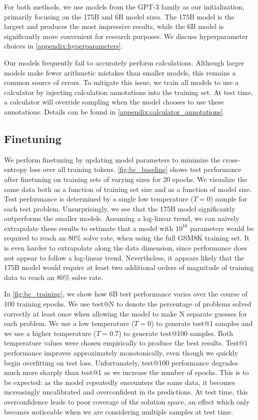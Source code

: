 For both methods, we use models from the GPT-3 family as our initialization, primarily focusing on the 175B and 6B model sizes. The 175B model is the largest and produces the most impressive results, while the 6B model is significantly more convenient for research purposes. We discuss hyperparameter choices in \ref{appendix:hyperparameters}.

Our models frequently fail to accurately perform calculations. Although larger models make fewer arithmetic mistakes than smaller models, this remains a common source of errors. To mitigate this issue, we train all models to use a calculator by injecting calculation annotations into the training set. At test time, a calculator will override sampling when the model chooses to use these annotations. Details can be found in \ref{appendix:calculator_annotations}.

\subsection{Finetuning}

We perform finetuning by updating model parameters to minimize the cross-entropy loss over all training tokens. \ref{fig:bc_baseline} shows test performance after finetuning on training sets of varying sizes for 20 epochs. We visualize the same data both as a function of training set size and as a function of model size. Test performance is determined by a single low temperature ($T=0$) sample for each test problem. Unsurprisingly, we see that the 175B model significantly outperforms the smaller models. Assuming a log-linear trend, we can naively extrapolate these results to estimate that a model with $10^{16}$ parameters would be required to reach an $80\%$ solve rate, when using the full GSM8K training set. It is even harder to extrapolate along the data dimension, since performance does not appear to follow a log-linear trend. Nevertheless, it appears likely that the 175B model would require at least two additional orders of magnitude of training data to reach an $80\%$ solve rate.

In \ref{fig:bc_training}, we show how 6B test performance varies over the course of 100 training epochs. We use test@N to denote the percentage of problems solved correctly at least once when allowing the model to make N separate guesses for each problem. We use a low temperature ($T=0$) to generate test@1 samples and we use a higher temperature ($T=0.7$) to generate test@100 samples. Both temperature values were chosen empirically to produce the best results. Test@1 performance improves approximately monotonically, even though we quickly begin overfitting on test loss. Unfortunately, test@100 performance degrades much more sharply than test@1 as we increase the number of epochs. This is to be expected: as the model repeatedly encounters the same data, it becomes increasingly uncalibrated and overconfident in its predictions. At test time, this overconfidence leads to poor coverage of the solution space, an effect which only becomes noticeable when we are considering multiple samples at test time.

